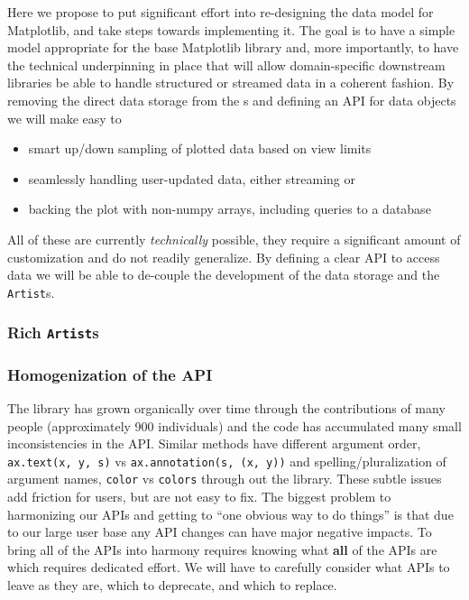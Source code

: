 \documentclass[11pt]{article}  %
\begin{document}
Here we propose to put significant effort into re-designing the data
model for Matplotlib, and take steps towards implementing it.  The
goal is to have a simple model appropriate for the base Matplotlib
library and, more importantly, to have the technical underpinning in
place that will allow domain-specific downstream libraries be able to
handle structured or streamed data in a coherent fashion.  By removing
the direct data storage from the s and defining an API
for data objects we will make easy to
\begin{itemize}
  \item smart up/down sampling of plotted data based on view limits
  \item seamlessly handling user-updated data, either streaming or
  \item backing the plot with non-numpy arrays, including queries to a
    database
\end{itemize}
All of these are currently \textit{technically} possible, they require
a significant amount of customization and do not readily generalize.
By defining a clear API to access data we will be able to de-couple the
development of the data storage and the \texttt{Artist}s.


\subsubsection{Rich \texttt{Artist}s}


\subsubsection{Homogenization of the API}

The library has grown organically over time through the contributions
of many people (approximately 900 individuals) and the code has
accumulated many small inconsistencies in the API.  Similar methods
have different argument order, \texttt{ax.text(x, y, s)} vs
\texttt{ax.annotation(s, (x, y))} and spelling/pluralization of
argument names, \texttt{color} vs \texttt{colors} through out the
library.  These subtle issues add friction for users, but are not easy
to fix.  The biggest problem to harmonizing our APIs and getting to
``one obvious way to do things'' is that due to our large user base
any API changes can have major negative impacts.  To bring all of the
APIs into harmony requires knowing what \textbf{all} of the APIs are
which requires dedicated effort.  We will have to carefully consider
what APIs to leave as they are, which to deprecate, and which to
replace.
\end{document}
